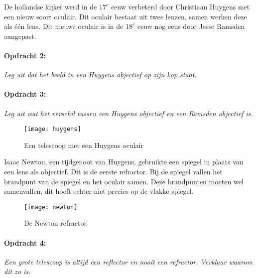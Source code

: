 De hollandse kijker werd in de $17^{e}$ eeuw verbeterd door Christiaan
Huygens met een nieuw soort oculair. Dit oculair bestaat uit twee
lenzen, samen werken deze als één lens. Dit nieuwe oculair is in de
$18^{e}$ eeuw nog eens door Jesse Ramsden aangepast.


\paragraph*{Opdracht 2:}

\emph{Leg uit dat het beeld in een Huygens objectief op zijn kop staat.}


\paragraph*{Opdracht 3:}

\emph{Leg uit wat het verschil tussen een Huygens objectief en een
Ramsden objectief is.}

\begin{figure}[H]
\noindent \begin{centering}
\texttt{[image: huygens]}
\par\end{centering}

\caption{Een telescoop met een Huygens oculair}
\end{figure}


Isaac Newton, een tijdgenoot van Huygens, gebruikte een spiegel in
plaats van een lens als objectief. Dit is de eerste refractor. Bij
de spiegel vallen het brandpunt van de spiegel en het oculair samen.
Deze brandpunten moeten wel samenvallen, dit hoeft echter niet precies
op de vlakke spiegel.

\begin{figure}[H]
\noindent \begin{centering}
\texttt{[image: newton]}
\par\end{centering}

\caption{De Newton refractor}
\end{figure}



\paragraph*{Opdracht 4:}

\emph{Een grote telescoop is altijd een reflector en nooit een refractor.
Verklaar waarom dit zo is.}

